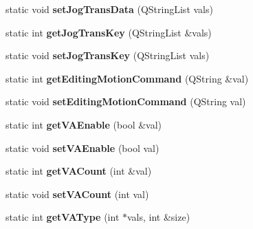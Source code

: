 \begin{DoxyCompactItemize}
\item 
\hypertarget{classRobotConf_a82e024b3cc31c87e6ca63e5ab879bff1}{static void {\bfseries set\-Jog\-Trans\-Data} (Q\-String\-List vals)}\label{classRobotConf_a82e024b3cc31c87e6ca63e5ab879bff1}

\item 
\hypertarget{classRobotConf_a8712c5834ffddd88c8d9c044d1f293fa}{static int {\bfseries get\-Jog\-Trans\-Key} (Q\-String\-List \&vals)}\label{classRobotConf_a8712c5834ffddd88c8d9c044d1f293fa}

\item 
\hypertarget{classRobotConf_a13119715649201a459d3059f7c6200d4}{static void {\bfseries set\-Jog\-Trans\-Key} (Q\-String\-List vals)}\label{classRobotConf_a13119715649201a459d3059f7c6200d4}

\item 
\hypertarget{classRobotConf_aa0112b54193aae353420041a8ddbed13}{static int {\bfseries get\-Editing\-Motion\-Command} (Q\-String \&val)}\label{classRobotConf_aa0112b54193aae353420041a8ddbed13}

\item 
\hypertarget{classRobotConf_ab70be4caf5a162909d98e5a4ae7da0bf}{static void {\bfseries set\-Editing\-Motion\-Command} (Q\-String val)}\label{classRobotConf_ab70be4caf5a162909d98e5a4ae7da0bf}

\item 
\hypertarget{classRobotConf_a1b7ef7fa7c18dae78369a1b3dc056d3a}{static int {\bfseries get\-V\-A\-Enable} (bool \&val)}\label{classRobotConf_a1b7ef7fa7c18dae78369a1b3dc056d3a}

\item 
\hypertarget{classRobotConf_a9c21a279d7a6b0be239ea774c019dc19}{static void {\bfseries set\-V\-A\-Enable} (bool val)}\label{classRobotConf_a9c21a279d7a6b0be239ea774c019dc19}

\item 
\hypertarget{classRobotConf_a81a36d2a1734b0fb8ee793be3a489269}{static int {\bfseries get\-V\-A\-Count} (int \&val)}\label{classRobotConf_a81a36d2a1734b0fb8ee793be3a489269}

\item 
\hypertarget{classRobotConf_a87f0294df09581f67dd47d0a3547627d}{static void {\bfseries set\-V\-A\-Count} (int val)}\label{classRobotConf_a87f0294df09581f67dd47d0a3547627d}

\item 
\hypertarget{classRobotConf_ac7db3859711014ebf2554f8c62dca2a3}{static int {\bfseries get\-V\-A\-Type} (int $\ast$vals, int \&size)}\label{classRobotConf_ac7db3859711014ebf2554f8c62dca2a3}


\end{DoxyCompactItemize}

